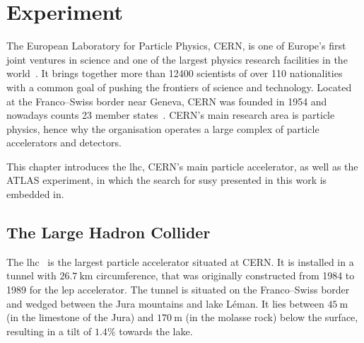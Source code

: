 
\chapter{Experiment} 

\graphicspath{{chapter-experiment/Figs/Vector/}{chapter-experiment/Figs/}}


The European Laboratory for Particle Physics, CERN,  is one of Europe's first joint ventures in science and one of the largest physics research facilities in the world~\cite{CERN:2723123}. It brings together more than \num[group-separator={,}]{12400} scientists of over 110 nationalities~\cite{CERN:2723123} with a common goal of pushing the frontiers of science and technology.
Located at the Franco--Swiss border near Geneva, CERN was founded in 1954 and nowadays counts 23 member states~\cite{CERN:2723123}. CERN's main research area is particle physics, hence why the organisation operates a large complex of particle accelerators and detectors.

This chapter introduces the \gls{lhc}, CERN's main particle accelerator, as well as the ATLAS experiment, in which the search for \gls{susy} presented in this work is embedded in.

\section{The Large Hadron Collider}\label{sec:lhc}

The \gls{lhc}~\cite{Bruning:782076} is the largest particle accelerator situated at CERN.
It is installed in a tunnel with $\SI{26.7}{\km}$ circumference, that was originally constructed from 1984 to 1989 for the \gls{lep} accelerator.
The tunnel is situated on the Franco--Swiss border and wedged between the Jura mountains and lake Léman. It lies between $\SI{45}{\meter}$ (in the limestone of the Jura) and $\SI{170}{\meter}$ (in the molasse rock) below the surface, resulting in a tilt of $1.4\%$ towards the lake.

